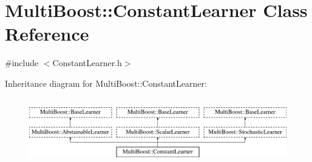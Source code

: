 \hypertarget{classMultiBoost_1_1ConstantLearner}{
\section{MultiBoost::ConstantLearner Class Reference}
\label{classMultiBoost_1_1ConstantLearner}
}


{\ttfamily \#include $<$ConstantLearner.h$>$}

Inheritance diagram for MultiBoost::ConstantLearner:\begin{figure}[H]
\begin{center}
\leavevmode
\includegraphics[height=2.871795cm]{classMultiBoost_1_1ConstantLearner}
\end{center}
\end{figure}
